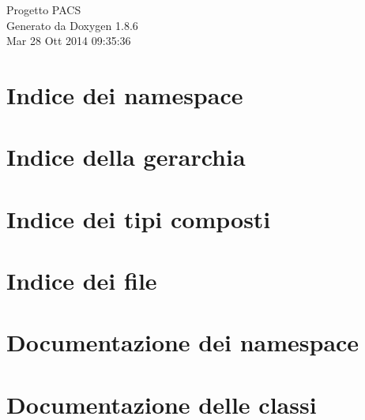 \documentclass[twoside]{book}
\newcommand{\clearemptydoublepage}{%
  \newpage{\pagestyle{empty}\cleardoublepage}%
}
\begin{document}
\hypersetup{pageanchor=false}
\begin{titlepage}
\vspace*{7cm}
\begin{center}%
{\Large Progetto P\-A\-C\-S }\\
\vspace*{1cm}
{\large Generato da Doxygen 1.8.6}\\
\vspace*{0.5cm}
{\small Mar 28 Ott 2014 09:35:36}\\
\end{center}
\end{titlepage}
\clearemptydoublepage
\tableofcontents
\clearemptydoublepage
{}
\hypersetup{pageanchor=true}

\chapter{Indice dei namespace}

\chapter{Indice della gerarchia}

\chapter{Indice dei tipi composti}

\chapter{Indice dei file}

\chapter{Documentazione dei namespace}


\chapter{Documentazione delle classi}






















\end{document}
